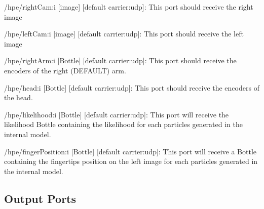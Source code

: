 \begin{DoxyItemize}
\item /hpe/right\+Cam\+:i \mbox{[}image\mbox{]} \mbox{[}default carrier\+:udp\mbox{]}\+: This port should receive the right image
\item /hpe/left\+Cam\+:i \mbox{[}image\mbox{]} \mbox{[}default carrier\+:udp\mbox{]}\+: This port should receive the left image
\item /hpe/right\+Arm\+:i \mbox{[}Bottle\mbox{]} \mbox{[}default carrier\+:udp\mbox{]}\+: This port should receive the encoders of the right (D\+E\+F\+A\+U\+LT) arm.
\item /hpe/head\+:i \mbox{[}Bottle\mbox{]} \mbox{[}default carrier\+:udp\mbox{]}\+: This port should receive the encoders of the head.
\item /hpe/likelihood\+:i \mbox{[}Bottle\mbox{]} \mbox{[}default carrier\+:udp\mbox{]}\+: This port will receive the likelihood Bottle containing the likelihood for each particles generated in the internal model.
\item /hpe/finger\+Position\+:i \mbox{[}Bottle\mbox{]} \mbox{[}default carrier\+:udp\mbox{]}\+: This port will receive a Bottle containing the fingertips position on the left image for each particles generated in the internal model.
\end{DoxyItemize}\hypertarget{group__handPoseEstimation-module_outputports_sec}{}\subsection{Output Ports}\label{group__handPoseEstimation-module_outputports_sec}

